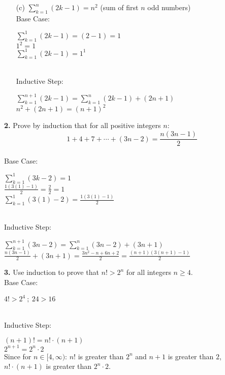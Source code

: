 \documentclass[12pt]{article}
\begin{document}
\begin{enumerate}
\item[(c)] $\sum_{k=1}^{n} (2k-1) = n^2$ (sum of first $n$ odd numbers)
\\[8pt]
Base Case:
\\[8pt]
\begin{minipage}[t][3cm][t]{\linewidth}
    $\displaystyle \sum_{k=1}^{1} (2k-1) = (2-1) = 1$
    \\[8pt] $1^2=1$
    \\[8pt] $\sum_{k=1}^{1} (2k-1) = 1^1$
\end{minipage}
\\[8pt]
Inductive Step:
\\[8pt]
\begin{minipage}[t][3cm][t]{\linewidth}
    $\displaystyle \sum_{k=1}^{n+1} (2k-1) = \sum_{k=1}^{n} (2k-1) + (2n+1)$
    \\[8pt] $n^2+(2n+1)=(n+1)^2$
\end{minipage}
\end{enumerate}

\textbf{2.} Prove by induction that for all positive integers $n$:
$$1 + 4 + 7 + \cdots + (3n-2) = \frac{n(3n-1)}{2}$$
\\[8pt]
Base Case:
\\[8pt]
\begin{minipage}[t][3cm][t]{\linewidth}
    $\displaystyle \sum_{k=1}^{1} (3k-2) = 1$
    \\[8pt] $\frac{1(3(1)-1)}{2}=\frac{2}{2}=1$
    \\[8pt] $\sum_{k=1}^{1} (3(1)-2) = \frac{1(3(1)-1)}{2}$
\end{minipage}
\\[8pt]
Inductive Step:
\\[8pt]
\begin{minipage}[t][3cm][t]{\linewidth}
    $\displaystyle \sum_{k=1}^{n+1} (3n-2) = \sum_{k=1}^{n} (3n-2) + (3n+1)$
    \\[8pt] $\frac{n(3n-1)}{2}+(3n+1)=\frac{3n^2-n+6n+2}{2}=\frac{(n+1)(3(n+1)-1)}{2}$
\end{minipage}

\newpage

\textbf{3.} Use induction to prove that $n! > 2^n$ for all integers $n \geq 4$.
\\[8pt]
Base Case:
\\[8pt]
\begin{minipage}[t][1cm][t]{\linewidth}
    $\displaystyle 4!>2^4 \ ; \ 24>16$
\end{minipage}
\\[8pt]
Inductive Step:
\\[8pt]
\begin{minipage}[t][3cm][t]{\linewidth}
    $\displaystyle (n+1)! = n! \cdot (n+1)$
    \\[8pt] $2^{n+1} = 2^n \cdot 2$
    \\[8pt] Since for $n \in [4, \infty)$: $n!$ is greater than $2^n$ and $n+1$ is greater than $2$, $n! \cdot (n+1)$ is greater than $2^n \cdot 2$.
\end{minipage}
\end{document}
